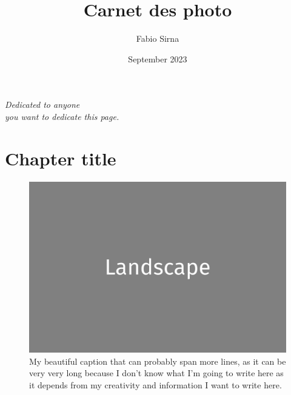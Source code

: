\documentclass[a4paper,twoside]{book}
\newcommand{\blankpage}{\newpage\hbox{}\thispagestyle{empty}\newpage}
\begin{document}

\frontmatter 

\color{Black}
\title{Carnet des photo}
\author{Fabio Sirna}
\date{September 2023}

\maketitle

\mainmatter 

%
%

\thispagestyle{empty} %

\begin{flushright}
    \emph{Dedicated to anyone}\\
    \emph{you want to dedicate this page.}\\
\end{flushright}


\color{BrickRed}
\chapter*{Chapter title}

\blankpage

\clearpage

\begin{figure}[H]
	\includegraphics[width=\textwidth]{landscape.png}
	\caption{My beautiful caption that can probably span more lines, as it can be very very long because I don't know what I'm going to write here as it depends from my creativity and information I want to write here.}
\end{figure}
\end{document}
